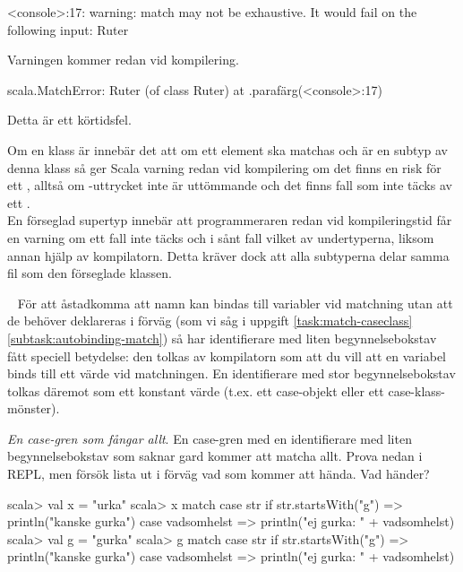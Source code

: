 \SubtaskSolved
\begin{REPL}
<console>:17: warning: match may not be exhaustive.
It would fail on the following input: Ruter
\end{REPL}
Varningen kommer redan vid kompilering.

\SubtaskSolved
\begin{REPL}
scala.MatchError: Ruter (of class Ruter)
  at .parafärg(<console>:17)
\end{REPL}
Detta är ett körtidsfel.

\SubtaskSolved  Om en klass är  innebär det att om ett element ska matchas och är en subtyp av denna klass så ger Scala varning redan vid kompilering om det finns en risk för ett , alltså om -uttrycket inte är uttömmande och det finns fall som inte täcks av ett .\\
En förseglad supertyp innebär att programmeraren redan vid kompileringstid får en varning om ett fall inte täcks och i sånt fall vilket av undertyperna, liksom annan hjälp av kompilatorn. Detta kräver dock att alla subtyperna delar samma fil som den förseglade klassen.



\QUESTEND




\QUESTBEGIN

\Task  \what~  För att åstadkomma att namn kan bindas till variabler vid matchning utan att de behöver deklareras i förväg (som vi såg i uppgift \ref{task:match-caseclass}\ref{subtask:autobinding-match}) så har identifierare med liten begynnelsebokstav fått speciell betydelse: den tolkas av kompilatorn som att du vill att en variabel  binds till ett värde vid matchningen. En identifierare med stor begynnelsebokstav tolkas däremot som ett konstant värde (t.ex. ett case-objekt eller ett case-klass-mönster).

\Subtask \emph{En case-gren som fångar allt}. En case-gren med en identifierare med liten begynnelsebokstav som saknar gard kommer att matcha allt. Prova nedan i REPL, men försök lista ut i förväg vad som kommer att hända. Vad händer?
\begin{REPL}
scala> val x = "urka"
scala> x match {
         case str if str.startsWith("g") => println("kanske gurka")
         case vadsomhelst => println("ej gurka: " + vadsomhelst)
       }
scala> val g = "gurka"
scala> g match {
         case str if str.startsWith("g") => println("kanske gurka")
         case vadsomhelst => println("ej gurka: " + vadsomhelst)
       }
\end{REPL}

